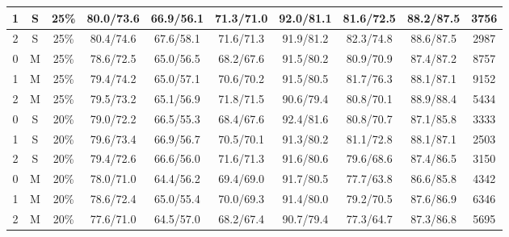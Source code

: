 \begin{table*}
{\begin{tabular}{|c|c|c||c|c|c|c|c|c||c|}
1 & S & 25\% & 80.0/73.6 & 66.9/56.1 & 71.3/71.0 & 92.0/81.1 & 81.6/72.5 & 88.2/87.5 & 3756 \\ \hline
2 & S & 25\% & 80.4/74.6 & 67.6/58.1 & 71.6/71.3 & 91.9/81.2 & 82.3/74.8 & 88.6/87.5 & 2987 \\ \hline
0 & M & 25\% & 78.6/72.5 & 65.0/56.5 & 68.2/67.6 & 91.5/80.2 & 80.9/70.9 & 87.4/87.2 & 8757 \\ \hline
1 & M & 25\% & 79.4/74.2 & 65.0/57.1 & 70.6/70.2 & 91.5/80.5 & 81.7/76.3 & 88.1/87.1 & 9152 \\ \hline
2 & M & 25\% & 79.5/73.2 & 65.1/56.9 & 71.8/71.5 & 90.6/79.4 & 80.8/70.1 & 88.9/88.4 & 5434 \\ \hline
0 & S & 20\% & 79.0/72.2 & 66.5/55.3 & 68.4/67.6 & 92.4/81.6 & 80.8/70.7 & 87.1/85.8 & 3333 \\ \hline
1 & S & 20\% & 79.6/73.4 & 66.9/56.7 & 70.5/70.1 & 91.3/80.2 & 81.1/72.8 & 88.1/87.1 & 2503 \\ \hline
2 & S & 20\% & 79.4/72.6 & 66.6/56.0 & 71.6/71.3 & 91.6/80.6 & 79.6/68.6 & 87.4/86.5 & 3150 \\ \hline
0 & M & 20\% & 78.0/71.0 & 64.4/56.2 & 69.4/69.0 & 91.7/80.5 & 77.7/63.8 & 86.6/85.8 & 4342 \\ \hline
1 & M & 20\% & 78.6/72.4 & 65.0/55.4 & 70.0/69.3 & 91.4/80.0 & 79.2/70.5 & 87.6/86.9 & 6346 \\ \hline
2 & M & 20\% & 77.6/71.0 & 64.5/57.0 & 68.2/67.4 & 90.7/79.4 & 77.3/64.7 & 87.3/86.8 & 5695 \\ \hline
\end{tabular}}
\end{table*}


